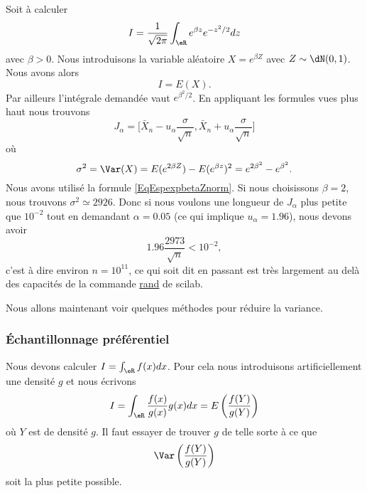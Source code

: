 \begin{example}
    Soit à calculer 
    \begin{equation}
        I=\frac{1}{ \sqrt{2\pi} }\int_{\eR} e^{\beta z} e^{-z^2/2}dz
    \end{equation}
    avec \( \beta>0\). Nous introduisons la variable aléatoire \( X= e^{\beta Z}\) avec \( Z\sim\dN(0,1)\). Nous avons alors 
    \begin{equation}
        I=E(X).
    \end{equation}
    Par ailleurs l'intégrale demandée vaut \(  e^{\beta^2/2}\). En appliquant les formules vues plus haut nous trouvons
    \begin{equation}
        J_{\alpha}=\big[ \bar X_n-u_{\alpha}\frac{ \sigma }{ \sqrt{n} },\bar X_n+u_{\alpha}\frac{ \sigma }{ \sqrt{n} } \big]
    \end{equation}
    où
    \begin{equation}
        \sigma^2=\Var(X)=E( e^{2\beta Z})-E( e^{\beta z})^2= e^{2\beta^2}- e^{\beta^2}.
    \end{equation}
    Nous avons utilisé la formule \eqref{EqEspexpbetaZnorm}. Si nous choisissons \( \beta=2\), nous trouvons \( \sigma^2\simeq 2926\). Donc si nous voulons une longueur de \( J_{\alpha}\) plus petite que \( 10^{-2}\) tout en demandant \( \alpha=0.05\) (ce qui implique \( u_{\alpha}=1.96\)), nous devons avoir
    \begin{equation}
        1.96\frac{ 2973 }{ \sqrt{n} }<10^{-2},
    \end{equation}
    c'est à dire environ \( n=10^{11}\), ce qui soit dit en passant est très largement au delà des capacités de la commande \href{http://www.iecn.u-nancy.fr/~pincon/scilab/Doc/node85.html}{rand} de scilab.
\end{example}

Nous allons maintenant voir quelques méthodes pour réduire la variance.

\subsubsection{Échantillonnage préférentiel}

Nous devons calculer \( I=\int_{\eR}f(x)dx\). Pour cela nous introduisons artificiellement une densité \( g\) et nous écrivons
\begin{equation}
    I=\int_{\eR}\frac{ f(x) }{ g(x) }g(x)dx=E\left( \frac{ f(Y) }{ g(Y) } \right)
\end{equation}
où \( Y\) est de densité \( g\). Il faut essayer de trouver \( g\) de telle sorte à ce que 
\begin{equation}
    \Var\left( \frac{ f(Y) }{ g(Y) } \right)
\end{equation}
soit la plus petite possible.

